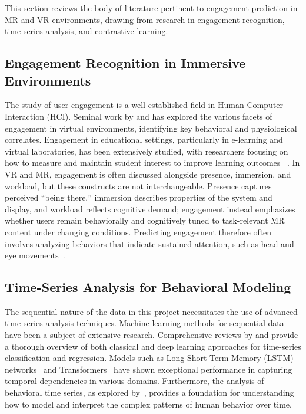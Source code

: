 \documentclass[review]{vgtc}                 %
\begin{document}
This section reviews the body of literature pertinent to engagement prediction in MR and VR environments, drawing from research in engagement recognition, time-series analysis, and contrastive learning.

\subsection{Engagement Recognition in Immersive Environments}
The study of user engagement is a well-established field in Human-Computer Interaction (HCI). Seminal work by \cite{radianti2020systematic} and \cite{merchant2014effectiveness} has explored the various facets of engagement in virtual environments, identifying key behavioral and physiological correlates. Engagement in educational settings, particularly in e-learning and virtual laboratories, has been extensively studied, with researchers focusing on how to measure and maintain student interest to improve learning outcomes ~\cite{hu2025influencing, viitaharju2023student}. In VR and MR, engagement is often discussed alongside presence, immersion, and workload, but these constructs are not interchangeable. Presence captures perceived ``being there,'' immersion describes properties of the system and display, and workload reflects cognitive demand; engagement instead emphasizes whether users remain behaviorally and cognitively tuned to task-relevant MR content under changing conditions. Predicting engagement therefore often involves analyzing behaviors that indicate sustained attention, such as head and eye movements~\cite{DavidJohn2021GazeIntentVR, Wang2025PresenceReview, austermann2025exploring}.

\subsection{Time-Series Analysis for Behavioral Modeling}
The sequential nature of the data in this project necessitates the use of advanced time-series analysis techniques. Machine learning methods for sequential data have been a subject of extensive research. Comprehensive reviews by \cite{ismail2019deep} and \cite{jebb2015time} provide a thorough overview of both classical and deep learning approaches for time-series classification and regression. Models such as Long Short-Term Memory (LSTM) networks~\cite{hochreiter1997long} and Transformers~\cite{thoyyibah2023transformers} have shown exceptional performance in capturing temporal dependencies in various domains. Furthermore, the analysis of behavioral time series, as explored by~\cite{xu2020finding}, provides a foundation for understanding how to model and interpret the complex patterns of human behavior over time.
\end{document}

